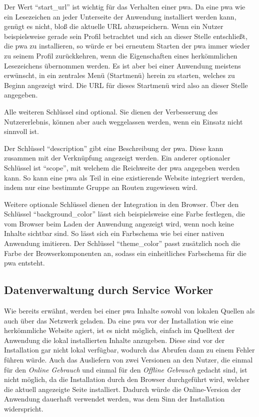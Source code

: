 \documentclass[12pt, parskip=half]{scrartcl}       %
\begin{document}
Der Wert \enquote{start\_url} ist wichtig für das Verhalten einer \ac{pwa}.
Da eine \ac{pwa} wie ein Lesezeichen an jeder Unterseite der Anwendung installiert werden kann, genügt es nicht, bloß die aktuelle URL abzuspeichern.
Wenn ein Nutzer beispielsweise gerade sein Profil betrachtet und sich an dieser Stelle entschließt, die \ac{pwa} zu installieren, so würde er bei erneutem Starten der \ac{pwa} immer wieder zu seinem Profil zurückkehren, wenn die Eigenschaften eines herkömmlichen Lesezeichens übernommen werden.
Es ist aber bei einer Anwendung meistens erwünscht, in ein zentrales Menü (Startmenü) herein zu starten, welches zu Beginn angezeigt wird.
Die URL für dieses Startmenü wird also an dieser Stelle angegeben.

Alle weiteren Schlüssel sind optional.
Sie dienen der Verbesserung des Nutzererlebnis, können aber auch weggelassen werden, wenn ein Einsatz nicht sinnvoll ist.

Der Schlüssel \enquote{description} gibt eine Beschreibung der \ac{pwa}.
Diese kann zusammen mit der Verknüpfung angezeigt werden.
Ein anderer optionaler Schlüssel ist \enquote{scope}, mit welchem die Reichweite der \ac{pwa} angegeben werden kann.
So kann eine \ac{pwa} als Teil in eine existierende Website integriert werden, indem nur eine bestimmte Gruppe an Routen zugewiesen wird\cite{webdev_addmanifest}.

Weitere optionale Schlüssel dienen der Integration in den Browser.
Über den Schlüssel \enquote{background\_color} lässt sich beispielsweise eine Farbe festlegen, die vom Browser beim Laden der Anwendung angezeigt wird, wenn noch keine Inhalte sichtbar sind.
So lässt sich ein Farbschema wie bei einer nativen Anwendung imitieren.
Der Schlüssel \enquote{theme\_color} passt zusätzlich noch die Farbe der Browserkomponenten an, sodass ein einheitliches Farbschema für die \ac{pwa} entsteht.



\subsection{Datenverwaltung durch Service Worker}

Wie bereits erwähnt, werden bei einer \ac{pwa} Inhalte sowohl von lokalen Quellen als auch über das Netzwerk geladen.
Da eine \ac{pwa} vor der Installation wie eine herkömmliche Website agiert, ist es nicht möglich, einfach im Quelltext der Anwendung die lokal installierten Inhalte anzugeben.
Diese sind vor der Installation gar nicht lokal verfügbar, wodurch das Abrufen dann zu einem Fehler führen würde.
Auch das Ausliefern von zwei Versionen an den Nutzer, die einmal für den \textit{Online Gebrauch} und einmal für den \textit{Offline Gebrauch} gedacht sind, ist nicht möglich, da die Installation durch den Browser durchgeführt wird, welcher die aktuell angezeigte Seite installiert.
Dadurch würde die Online-Version der Anwendung dauerhaft verwendet werden, was dem Sinn der Installation widerspricht.
\end{document}
